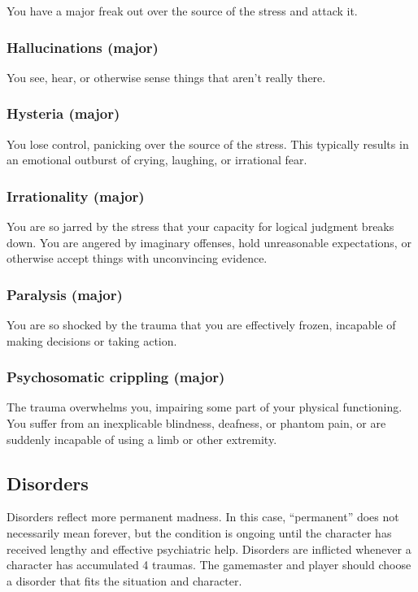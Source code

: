 You have a major freak out over the source of the stress and attack it.

\subsubsection{Hallucinations (major)}

You see, hear, or otherwise sense things that aren’t really there.

\subsubsection{Hysteria (major)}

You lose control, panicking over the source of the stress. This typically results in an emotional outburst of crying, laughing, or irrational fear.

\subsubsection{Irrationality (major)}

You are so jarred by the stress that your capacity for logical judgment breaks down. You are angered by imaginary offenses, hold unreasonable expectations, or otherwise accept things with unconvincing evidence.

\subsubsection{Paralysis (major)}

You are so shocked by the trauma that you are effectively frozen, incapable of making decisions or taking action.

\subsubsection{Psychosomatic crippling (major)}

The trauma overwhelms you, impairing some part of your physical functioning. You suffer from an inexplicable blindness, deafness, or phantom pain, or are suddenly incapable of using a limb or other extremity.


\subsection{Disorders}
\label{sec:disorders}

Disorders reflect more permanent madness. In this case, ``permanent” does not necessarily mean forever, but the condition is ongoing until the character has received lengthy and effective psychiatric help. Disorders are inflicted whenever a character has accumulated 4 traumas. The gamemaster and player should choose a disorder that fits the situation and character.

